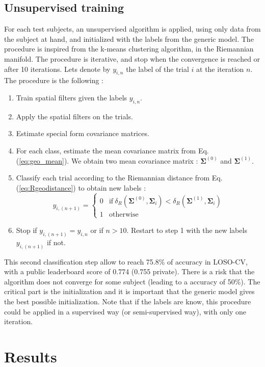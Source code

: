 \documentclass[11pt,a4paper]{article}
\begin{document}
\subsection{Unsupervised training}
For each test subjects, an unsupervised algorithm is applied, using only data from the subject at hand, and initialized with the labels from the generic model. The procedure is inspired from the k-means clustering algorithm, in the Riemannian manifold. The procedure is iterative, and stop when the convergence is reached or after 10 iterations.
Lets denote by $y_{i,n}$ the label of the trial $i$ at the iteration $n$. The procedure is the following :
\begin{enumerate}
\item Train spatial filters given the labels $y_{i,n}$.
\item Apply the spatial filters on the trials.
\item Estimate special form covariance matrices.
\item For each class, estimate the mean covariance matrix from Eq.(\ref{eq:geo_mean}). We obtain two mean covariance matrix : $\mathbf{\Sigma}^{(0)}$ and $\mathbf{\Sigma}^{(1)}$.
\item Classify each trial according to the Riemannian distance from Eq.(\ref{eq:Rgeodistance}) to obtain new labels : 
\begin{equation}
 	 y_{i,(n+1)} = \left\{ \begin{array}{rl}
0 & \text{if} \:  \delta_R(\mathbf{\Sigma}^{(0)},\mathbf{\Sigma}_i) < \delta_R(\mathbf{\Sigma}^{(1)},\mathbf{\Sigma}_i)\\
1 & \text{otherwise}
\end{array} \right.
\end{equation} 
\item Stop if $y_{i,(n+1)}= y_{i,n}$ or if $n>10$. Restart to step 1 with the new labels $y_{i,(n+1)}$ if not.
\end{enumerate}

This second classification step allow to reach 75.8\% of accuracy in LOSO-CV, with a public leaderboard score of 0.774 (0.755 private). There is a risk that the algorithm does not converge for some subject (leading to a accuracy of 50\%). The critical part is the initialization and it is important that the generic model gives the best possible initialization.
Note that if the labels are know, this procedure could be applied in a supervised way (or semi-supervised way), with only one iteration.

\section{Results}
\end{document}
